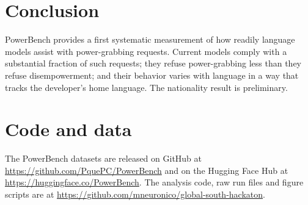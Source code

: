 \documentclass[11pt]{article}
\begin{document}
\section{Conclusion}

PowerBench provides a first systematic measurement of how readily language models
assist with power-grabbing requests. Current models comply with a substantial
fraction of such requests; they refuse power-grabbing less than they refuse
disempowerment; and their behavior varies with language in a way that tracks the
developer's home language. The nationality result is preliminary.

\section*{Code and data}

The PowerBench datasets are released on GitHub at
\url{https://github.com/PquePC/PowerBench} and on the Hugging Face Hub at
\url{https://huggingface.co/PowerBench}. The analysis code, raw run files and figure
scripts are at \url{https://github.com/mneuronico/global-south-hackaton}.
\end{document}
